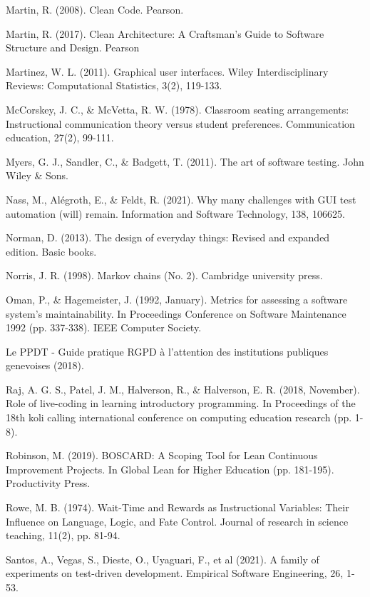 \documentclass[10pt]{article}
\begin{document}
\begin{thebibliography}{Xyzz12}
 Martin, R. (2008). Clean Code. Pearson.

 Martin, R. (2017). Clean Architecture: A Craftsman’s Guide to Software Structure and Design. Pearson

 Martinez, W. L. (2011). Graphical user interfaces. Wiley Interdisciplinary Reviews: Computational Statistics, 3(2), 119-133.

 McCorskey, J. C., \& McVetta, R. W. (1978). Classroom seating arrangements: Instructional communication theory versus student preferences. Communication education, 27(2), 99-111.

 Myers, G. J., Sandler, C., \& Badgett, T. (2011). The art of software testing. John Wiley \& Sons.

 Nass, M., Alégroth, E., \& Feldt, R. (2021). Why many challenges with GUI test automation (will) remain. Information and Software Technology, 138, 106625.

 Norman, D. (2013). The design of everyday things: Revised and expanded edition. Basic books.

 Norris, J. R. (1998). Markov chains (No. 2). Cambridge university press.

 Oman, P., \& Hagemeister, J. (1992, January). Metrics for assessing a software system's maintainability. In Proceedings Conference on Software Maintenance 1992 (pp. 337-338). IEEE Computer Society.


 Le PPDT - Guide pratique RGPD à l'attention des institutions publiques genevoises (2018).

 Raj, A. G. S., Patel, J. M., Halverson, R., \& Halverson, E. R. (2018, November). Role of live-coding in learning introductory programming. In Proceedings of the 18th koli calling international conference on computing education research (pp. 1-8).

 Robinson, M. (2019). BOSCARD: A Scoping Tool for Lean Continuous Improvement Projects. In Global Lean for Higher Education (pp. 181-195). Productivity Press.

 Rowe, M. B. (1974). Wait-Time and Rewards as Instructional Variables: Their Influence on Language, Logic, and Fate Control. Journal of research in science teaching, 11(2), pp. 81-94.

Santos, A., Vegas, S., Dieste, O., Uyaguari, F., et al (2021). A family of experiments on test-driven development. Empirical Software Engineering, 26, 1-53.


\end{thebibliography}
\end{document}

